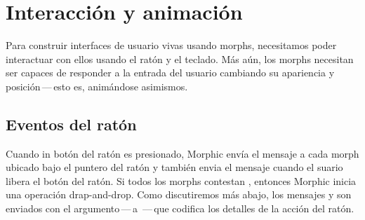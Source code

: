 \documentclass[a4paper,10pt,twoside]{book}
\begin{document}





\section{Interacci\'on y animaci\'on }

Para construir interfaces de usuario vivas usando morphs, necesitamos poder interactuar con ellos usando el rat\'on y el teclado. 
Más aún, los morphs necesitan ser capaces de responder a la entrada del usuario cambiando su apariencia y posici\'on\,---\,esto es, anim\'andose asimismos.


\subsection{Eventos del rat\'on}

Cuando in bot\'on del rat\'on es presionado, Morphic env\'ia el mensaje  a cada morph ubicado bajo el puntero del rat\'on y también envia el mensaje  cuando el suario libera el bot\'on del rat\'on.
Si todos los morphs contestan , entonces Morphic inicia una operaci\'on drap-and-drop.
Como discutiremos m\'as abajo, los mensajes  y  son enviados con el argumento\,---\,a  \,---\,que codifica los detalles de la acci\'on del rat\'on.
\end{document}
